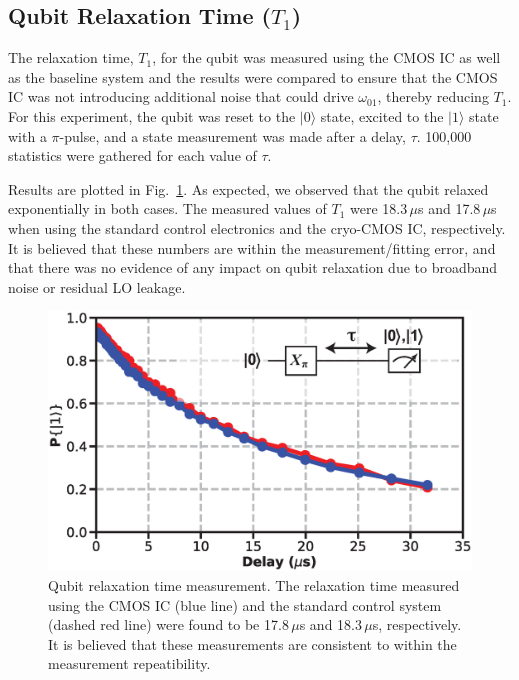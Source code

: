 \documentclass[journal]{IEEEtran}
\newcommand{\CR}[1]{{\color{black}#1}}
\begin{document}
\subsection{Qubit Relaxation Time ($T_\text{1}$)}
The relaxation time, $T_\text{1}$, for the qubit was measured using the CMOS IC as well as the baseline system and the results were compared to ensure that the CMOS IC was not introducing additional noise that could drive $\omega_\text{01}$, thereby reducing $T_\text{1}$. For this experiment, the qubit was reset to the $|0\rangle$ state, excited to the $|1\rangle$ state with a $\pi$-pulse, and a state measurement was made after a delay, $\tau$. 100,000 statistics were gathered for each value of $\tau$. 

Results are plotted in Fig.~\ref{decoherence}. As expected, we observed that the qubit relaxed exponentially in both cases. The measured values of $T_\text{1}$ were 18.3\,$\mu$s and 17.8\,$\mu$s when using the standard control electronics and the cryo-CMOS IC, respectively. It is believed that these numbers are within the measurement/fitting error, and that there was no evidence of any impact on qubit relaxation due to broadband noise \CR{or residual LO leakage}. 
\begin{figure}[bt!]
\includegraphics[width=\columnwidth]{Figures/FIGURE_19}
\caption{Qubit relaxation time measurement. The relaxation time measured using the CMOS IC (blue line) and the standard control system (dashed red line) were found to be 17.8\,\CR{$\mu$}s and 18.3\,$\mu$s, respectively. It is believed that these measurements are consistent to within the measurement repeatibility.}\label{decoherence}
\end{figure}
\end{document}
